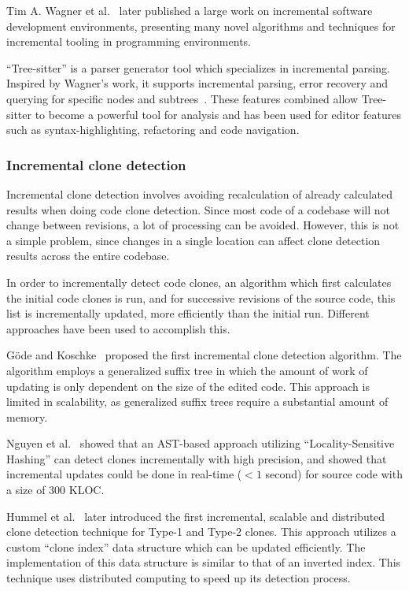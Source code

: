Tim A. Wagner et al.~\cite{PracticalAlgorithmsForIncremental} later published a large work
on incremental software development environments, presenting many novel algorithms and
techniques for incremental tooling in programming environments.

``Tree-sitter'' is a parser generator tool which specializes in incremental parsing.
Inspired by Wagner's work, it supports incremental parsing, error recovery and querying
for specific nodes and subtrees~\cite{treesitter}. These features combined allow
Tree-sitter to become a powerful tool for analysis and has been used for editor features
such as syntax-highlighting, refactoring and code navigation.

\subsubsection{Incremental clone detection}

Incremental clone detection involves avoiding recalculation of already calculated results
when doing code clone detection. Since most code of a codebase will not change between
revisions, a lot of processing can be avoided. However, this is not a simple problem,
since changes in a single location can affect clone detection results across the entire
codebase.

In order to incrementally detect code clones, an algorithm which first calculates the
initial code clones is run, and for successive revisions of the source code, this list is
incrementally updated, more efficiently than the initial run. Different approaches have
been used to accomplish this.

Göde and Koschke~\cite{GodeIncrementalCloneDetection} proposed the first incremental clone
detection algorithm. The algorithm employs a generalized suffix tree in which the amount
of work of updating is only dependent on the size of the edited code. This approach is
limited in scalability, as generalized suffix trees require a substantial amount of
memory.

Nguyen et al.~\cite{LocalitySensitiveHashingIncremental} showed that an AST-based approach
utilizing ``Locality-Sensitive Hashing'' can detect clones incrementally with high
precision, and showed that incremental updates could be done in real-time ($< 1$ second)
for source code with a size of 300 KLOC.

Hummel et al.~\cite{IndexBasedIncrementalCloneDetection} later introduced the first incremental,
scalable and distributed clone detection technique for Type-1 and Type-2 clones. This
approach utilizes a custom ``clone index'' data structure which can be updated
efficiently. The implementation of this data structure is similar to that of an inverted
index. This technique uses distributed computing to speed up its detection process.

